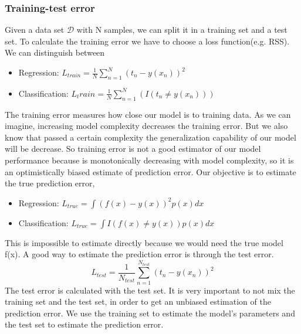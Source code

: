 \documentclass[main.tex]{subfiles}
\begin{document}
\subsubsection{Training-test error}
Given a data set $\mathcal{D}$ with N samples, we can split it in a training set and a test set.
To calculate the training error we have to choose a loss function(e.g. RSS).
We can distinguish between
\begin{itemize}
    \item Regression: $L_{train} = \frac{1}{N} \sum_{n=1}^N (t_n - y(x_n))^2$
    \item Classification: $L_train = \frac{1}{N} \sum_{n=1}^N (I(t_n \neq y(x_n)))$
\end{itemize}
The training error measures how close our model is to training data. As we can imagine, increasing model complexity decreases the training error. But we also know that passed a certain complexity the generalization capability of our model will be decrease. So training error is not a good estimator of our model performance because is monotonically decreasing with model complexity, so it is an optimistically biased estimate of prediction error.
Our objective is to estimate the true prediction error,
\begin{itemize}
    \item Regression: $L_{true} = \int (f(x) - y(x))^2 p(x)dx$
    \item Classification: $L_{true} = \int I(f(x) \neq y(x)) p(x)dx$
\end{itemize}
This is impossible to estimate directly because we would need the true model f(x). A good way to estimate the prediction error is through the test error.
\begin{equation}
    L_{test} = \frac{1}{N_{test}} \sum_{n=1}^{N_{test}} (t_n - y(x_n))^2
\end{equation}
The test error is calculated with the test set. It is very important to not mix the training set and the test set, in order to get an unbiased estimation of the prediction error.
We use the training set to estimate the model's parameters and the test set to estimate the prediction error.
\end{document}
